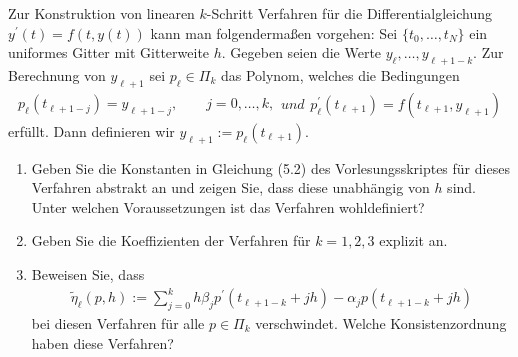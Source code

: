 \begin{exercise}
Zur Konstruktion von linearen $k$-Schritt Verfahren für die Differentialgleichung
$y^{\prime}(t) = f(t,y(t))$ kann man folgendermaßen vorgehen: Sei $\{t_0,\dots,t_N\}$
ein uniformes Gitter mit Gitterweite $h$. Gegeben seien die Werte $y_{\ell},\dots,y_{\ell + 1 - k}$.
Zur Berechnung von $y_{\ell + 1}$ sei $p_{\ell} \in \Pi_k$ das Polynom, welches
die Bedingungen
\begin{subequations}
\begin{align}\label{lagrange}
  p_{\ell}(t_{\ell + 1 - j}) = y_{\ell + 1 - j}, \qquad j = 0,\dots,k,
\end{align}
und
\begin{align}
  p_{\ell}^{\prime}(t_{\ell + 1}) = f(t_{\ell + 1},y_{\ell + 1})
\end{align}
\end{subequations}
erfüllt. Dann definieren wir $y_{\ell + 1} := p_{\ell}(t_{\ell + 1})$.
\begin{enumerate}[label = \textbf{\alph*)}]
  \item Geben Sie die Konstanten in Gleichung (5.2) des Vorlesungsskriptes für
  dieses Verfahren abstrakt an und zeigen Sie, dass diese unabhängig von $h$ sind.
  Unter welchen Voraussetzungen ist das Verfahren wohldefiniert?
  \item Geben Sie die Koeffizienten der Verfahren für $k = 1,2,3$ explizit an.
  \item Beweisen Sie, dass
  \begin{align}
    \tilde{\eta}_{\ell}(p,h) := \sum_{j= 0}^kh\beta_jp^{\prime}(t_{\ell + 1 -k} + jh)
    - \alpha_jp(t_{\ell + 1 - k} + jh)
  \end{align}
  bei diesen Verfahren für alle $p \in \Pi_k$ verschwindet. Welche Konsistenzordnung
  haben diese Verfahren?
\end{enumerate}
\end{exercise}
